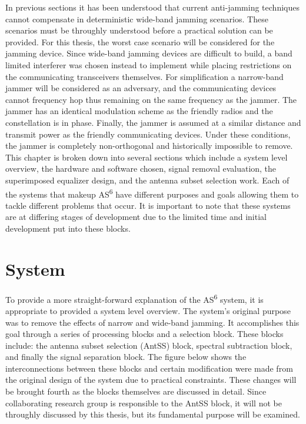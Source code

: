 In previous sections it has been understood that current anti-jamming techniques cannot compensate in deterministic wide-band jamming scenarios.  These scenarios must be throughly understood before a practical solution can be provided.  For this thesis, the worst case scenario will be considered for the jamming device.  Since wide-band jamming devices are difficult to build, a band limited interferer was chosen instead to implement while placing restrictions on the communicating transceivers themselves.  For simplification a narrow-band jammer will be considered as an adversary, and the communicating devices cannot frequency hop thus remaining on the same frequency as the jammer.  The jammer has an identical modulation scheme as the friendly radios and the constellation is in phase.  Finally, the jammer is assumed at a similar distance and transmit power as the friendly communicating devices.  Under these conditions, the jammer is completely non-orthogonal and historically impossible to remove.\\

This chapter is broken down into several sections which include a system level overview, the hardware and software chosen, signal removal evaluation, the superimposed equalizer design, and the antenna subset selection work.  Each of the systems that makeup AS\textsuperscript{6} have different purposes and goals allowing them to tackle different problems that occur.  It is important to note that these systems are at differing stages of development due to the limited time and initial development put into these blocks.\\ 

\section{System}

To provide a more straight-forward explanation of the AS\textsuperscript{6} system, it is appropriate to provided a system level overview.  The system's original purpose was to remove the effects of narrow and wide-band jamming.  It accomplishes this goal through a series of processing blocks and a selection block.  These blocks include: the antenna subset selection (AntSS) block, spectral subtraction block, and finally the signal separation block.  The figure below shows the interconnections between these blocks and certain modification were made from the original design of the system due to practical constraints.  These changes will be brought fourth as the blocks themselves are discussed in detail. Since collaborating research group is responsible to the AntSS block, it will not be throughly discussed by this thesis, but its fundamental purpose will be examined.\\

